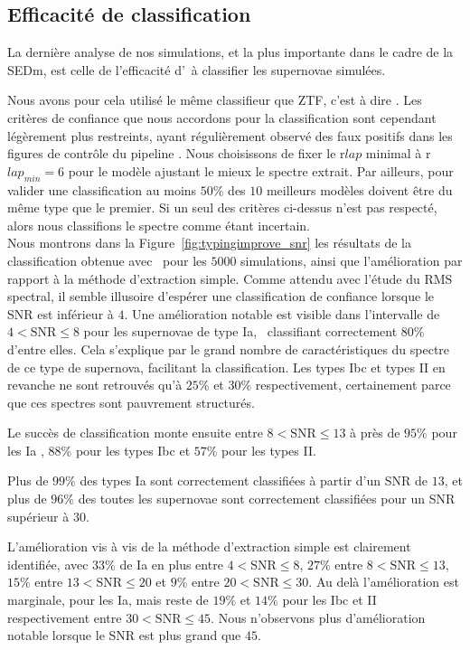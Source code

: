 \documentclass[../main/main.tex]{subfiles}
\begin{document}
\clearpage
\subsection{Efficacité de classification}\label{ssec:typingsimu}

La dernière analyse de nos simulations, et la plus importante dans le
cadre de la SEDm, est celle de l'efficacité d'\hypergal\ à classifier
les supernovae simulées.

Nous avons pour cela utilisé le même classifieur que ZTF, c'est à dire
. Les critères de confiance que nous accordons pour la classification
sont cependant légèrement plus restreints, ayant régulièrement observé
des faux positifs dans les figures de contrôle du pipeline \pysedm. Nous
choisissons de fixer le r$lap$ minimal à r$lap_{min}=6$ pour le modèle
ajustant le mieux le spectre extrait. Par ailleurs, pour valider une
classification au moins $50\%$ des $10$ meilleurs modèles doivent être
du même type que le premier. Si un seul des critères ci-dessus n'est pas
respecté, alors nous classifions le spectre comme étant incertain.\\

Nous montrons dans la Figure~\ref{fig:typingimprove_snr} les résultats
de la classification obtenue avec \hypergal\ pour les $5000$
simulations, ainsi que l'amélioration par rapport à la méthode
d'extraction simple. Comme attendu avec l'étude du RMS spectral, il
semble illusoire d'espérer une classification de confiance lorsque le
SNR est inférieur à $4$. Une amélioration notable est visible dans
l'intervalle de $4<\text{SNR}\leq8$ pour les supernovae de type Ia,
\hypergal\ classifiant correctement $80\%$ d'entre elles. Cela
s'explique par le grand nombre de caractéristiques du spectre de ce type
de supernova, facilitant la classification. Les types Ibc et types II en
revanche ne sont retrouvés qu'à $25\%$ et $30\%$ respectivement, certainement parce que
ces spectres sont pauvrement structurés.

Le succès de classification monte ensuite entre $8<\text{SNR}\leq13$ à près de $95\%$ pour les Ia
, $88\%$ pour les types  Ibc et $57\%$ pour les types II.

Plus de $99\%$ des types Ia sont correctement classifiées à partir d'un
SNR de $13$, et plus de $96\%$ des toutes les supernovae sont
correctement classifiées pour un SNR supérieur à $30$.

L'amélioration vis à vis de la méthode d'extraction simple est
clairement identifiée, avec $33\%$ de Ia en plus entre $4<\text{SNR}\leq8$,
$27\%$ entre $8<\text{SNR}\leq13$, $15\%$ entre $13<\text{SNR}\leq20$ et
$9\%$ entre $20<\text{SNR}\leq30$. Au delà l'amélioration est marginale,
pour les Ia, mais reste de $19\%$ et $14\%$ pour les Ibc
et II respectivement entre $30<\text{SNR}\leq45$. Nous n'observons plus d'amélioration
notable lorsque le SNR est plus grand que
$45$.
\end{document}
